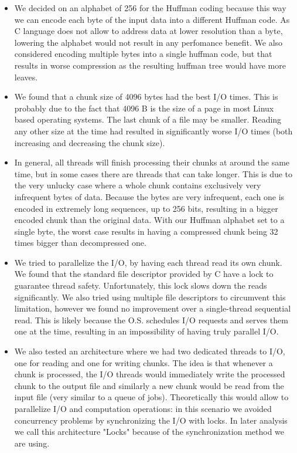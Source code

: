\begin{itemize}
\item We decided on an alphabet of 256 for the Huffman coding because this way we can encode each byte of the input data into a different Huffman code. As C language does not allow to address data at lower resolution than a byte, lowering the alphabet would not result in any perfomance benefit. We also considered encoding multiple bytes into a single huffman code, but that results in worse compression as the resulting huffman tree would have more leaves.

\item We found that a chunk size of 4096 bytes had the best I/O times. This is probably due to the fact that 4096 B is the size of a page in most Linux based operating systems. The last chunk of a file may be smaller. Reading any other size at the time had resulted in significantly worse I/O times (both increasing and decreasing the chunk size).

\item In general, all threads will finish processing their chunks at around the same time, but in some cases there are threads that can take longer. This is due to the very unlucky case where a whole chunk contains exclusively very infrequent bytes of data. Because the bytes are very infrequent, each one is encoded in extremely long sequences, up to 256 bits, resulting in a bigger encoded chunk than the original data. With our Huffman alphabet set to a single byte, the worst case results in having a compressed chunk being 32 times bigger than decompressed one.

\item We tried to parallelize the I/O, by having each thread read its own chunk. We found that the standard file descriptor provided by C have a lock to guarantee thread safety. Unfortunately, this lock slows down the reads significantly. We also tried using multiple file descriptors to circumvent this limitation, however we found no improvement over a single-thread sequential read. This is likely because the O.S. schedules I/O requests and serves them one at the time, resulting in an impossibility of having truly parallel I/O.

\item We also tested an architecture where we had two dedicated threads to I/O, one for reading and one for writing chunks. The idea is that whenever a chunk is processed, the I/O threads would immediately write the processed chunk to the output file and similarly a new chunk would be read from the input file (very similar to a queue of jobs). Theoretically this would allow to parallelize I/O and computation operations: in this scenario we avoided concurrency problems by synchronizing the I/O with locks. In later analysis we call this architecture "Locks" because of the synchronization method we are using.


\end{itemize}
